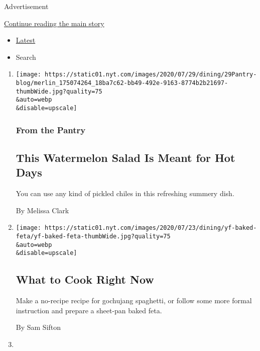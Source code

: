Advertisement

\protect\hyperlink{after-mid1}{Continue reading the main story}

\begin{itemize}
\tightlist
\item
  \protect\hyperlink{stream-panel}{Latest}
\item
  Search
\end{itemize}

\begin{enumerate}
\def\labelenumi{\arabic{enumi}.}
\item
  \href{/2020/07/29/dining/watermelon-salad-recipe.html}{}

  \texttt{[image: https://static01.nyt.com/images/2020/07/29/dining/29Pantry-blog/merlin\_175074264\_18ba7c62-bb49-492e-9163-8774b2b21697-thumbWide.jpg?quality=75\\\&auto=webp\\\&disable=upscale]}

  \hypertarget{from-the-pantry}{%
  \subsubsection{From the Pantry}\label{from-the-pantry}}

  \hypertarget{this-watermelon-salad-is-meant-for-hot-days}{%
  \subsection{This Watermelon Salad Is Meant for Hot
  Days}\label{this-watermelon-salad-is-meant-for-hot-days}}

  You can use any kind of pickled chiles in this refreshing summery
  dish.

  By Melissa Clark
\item
  \href{/2020/07/29/dining/what-to-cook-right-now.html}{}

  \texttt{[image: https://static01.nyt.com/images/2020/07/23/dining/yf-baked-feta/yf-baked-feta-thumbWide.jpg?quality=75\\\&auto=webp\\\&disable=upscale]}

  \hypertarget{what-to-cook-right-now}{%
  \subsection{What to Cook Right Now}\label{what-to-cook-right-now}}

  Make a no-recipe recipe for gochujang spaghetti, or follow some more
  formal instruction and prepare a sheet-pan baked feta.

  By Sam Sifton
\item
  \href{/2020/07/29/well/move/blood-sugar-diet-foods-workouts-exercise-muscles.html}{}


\end{enumerate}

